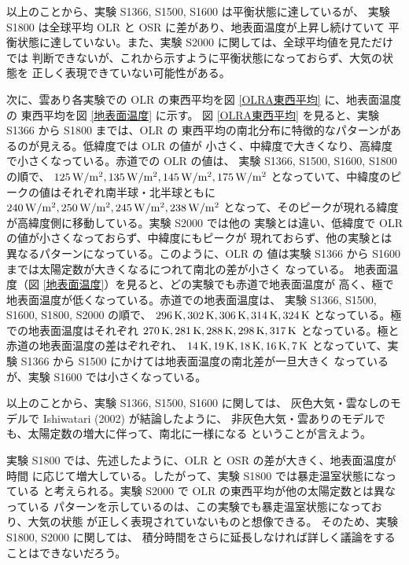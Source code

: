 \documentclass[body]{subfiles}
\begin{document}
以上のことから、実験 S1366, S1500, S1600 は平衡状態に達しているが、
実験 S1800 は全球平均 OLR と OSR に差があり、地表面温度が上昇し続けていて
平衡状態に達していない。また、実験 S2000 に関しては、全球平均値を見ただけでは
判断できないが、これから示すように平衡状態になっておらず、大気の状態を
正しく表現できていない可能性がある。

次に、雲あり各実験での OLR の東西平均を図 \ref{OLRA東西平均} に、地表面温度の
東西平均を図 \ref{地表面温度} に示す。
図 \ref{OLRA東西平均} を見ると、実験 S1366 から S1800 までは、OLR の
東西平均の南北分布に特徴的なパターンがあるのが見える。低緯度では OLR の値が
小さく、中緯度で大きくなり、高緯度で小さくなっている。赤道での OLR の値は、
実験 S1366, S1500, S1600, S1800 の順で、
\(125\hmu{W/m^2},135\hmu{W/m^2},145\hmu{W/m^2},175\hmu{W/m^2}\)
となっていて、中緯度のピークの値はそれぞれ南半球・北半球ともに
\(240\hmu{W/m^2},250\hmu{W/m^2},245\hmu{W/m^2},238\hmu{W/m^2}\)
となって、そのピークが現れる緯度が高緯度側に移動している。実験 S2000 では他の
実験とは違い、低緯度で OLR の値が小さくなっておらず、中緯度にもピークが
現れておらず、他の実験とは異なるパターンになっている。このように、OLR の
値は実験 S1366 から S1600 までは太陽定数が大きくなるにつれて南北の差が小さく
なっている。
地表面温度（図 \ref{地表面温度}）を見ると、どの実験でも赤道で地表面温度が
高く、極で地表面温度が低くなっている。赤道での地表面温度は、
実験 S1366, S1500, S1600, S1800, S2000 の順で、
\(296\hmu{K},302\hmu{K},306\hmu{K},314\hmu{K},324\hmu{K}\)
となっている。極での地表面温度はそれぞれ
\(270\hmu{K},281\hmu{K},288\hmu{K},298\hmu{K},317\hmu{K}\)
となっている。極と赤道の地表面温度の差はぞれぞれ、
\(14\hmu{K},19\hmu{K},18\hmu{K},16\hmu{K},7\hmu{K}\)
となっていて、実験 S1366 から S1500 にかけては地表面温度の南北差が一旦大きく
なっているが、実験 S1600 では小さくなっている。

以上のことから、実験 S1366, S1500, S1600 に関しては、
灰色大気・雲なしのモデルで Ishiwatari \etal (2002) が結論したように、
非灰色大気・雲ありのモデルでも、太陽定数の増大に伴って、南北に一様になる
ということが言えよう。

実験 S1800 では、先述したように、OLR と OSR の差が大きく、地表面温度が時間
に応じて増大している。したがって、実験 S1800 では暴走温室状態になっている
と考えられる。実験 S2000 で OLR の東西平均が他の太陽定数とは異なっている
パターンを示しているのは、この実験でも暴走温室状態になっており、大気の状態
が正しく表現されていないものと想像できる。
そのため、実験 S1800, S2000 に関しては、
積分時間をさらに延長しなければ詳しく議論をすることはできないだろう。
\end{document}
